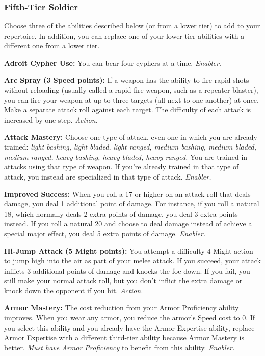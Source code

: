 \documentclass[a4paper,10pt,final,twocolumn,oneside]{book}
\newcommand{\itemAbility}[2]{\textcolor{25gray}{\textbullet\textbf{ #1:}}{ #2}\par}
\newcommand{\enabler}{\textit{ Enabler.}}
\newcommand{\action}{\textit{ Action.}}
\begin{document}

\subsubsection*{Fifth-Tier Soldier}
\label{subsub:soldierFifthTier}

Choose three of the abilities described below (or from a lower tier) to add to your repertoire. In addition, you can replace one of your lower-tier abilities with a different one from a lower tier.

\itemAbility{Adroit Cypher Use}{You can bear four cyphers at a time.\enabler}

\itemAbility{Arc Spray (3 Speed points)}{If a weapon has the ability to fire rapid shots without reloading (usually called a rapid-fire weapon, such as a repeater blaster), you can fire your weapon at up to three targets (all next to one another) at once. Make a separate attack roll against each target. The difficulty of each attack is increased by one step.\action}

\itemAbility{Attack Mastery}{Choose one type of attack, even one in which you are already trained: \textit{light bashing, light bladed, light ranged, medium bashing, medium bladed, medium ranged, heavy bashing, heavy bladed, heavy ranged.} You are trained in attacks using that type of weapon. If you’re already trained in that type of attack, you instead are specialized in that type of attack.\enabler}

\itemAbility{Improved Success}{When you roll a 17 or higher on an attack roll that deals damage, you deal 1 additional point of damage. For instance, if you roll a natural 18, which normally deals 2 extra points of damage, you deal 3 extra points instead. If you roll a natural 20 and choose to deal damage instead of achieve a special major effect, you deal 5 extra points of damage.\enabler}

\itemAbility{Hi-Jump Attack (5 Might points)}{You attempt a difficulty 4 Might action to jump high into the air as part of your melee attack. If you succeed, your attack inflicts 3 additional points of damage and knocks the foe down. If you fail, you still make your normal attack roll, but you don’t inflict the extra damage or knock down the opponent if you hit.\action}

\itemAbility{Armor Mastery}{The cost reduction from your Armor Proficiency ability improves. When you wear any armor, you reduce the armor’s Speed cost to 0. If you select this ability and you already have the Armor Expertise ability, replace Armor Expertise with a different third-tier ability because Armor Mastery is better. \textit{Must have Armor Proficiency} to benefit from this ability.\enabler}
\end{document}
